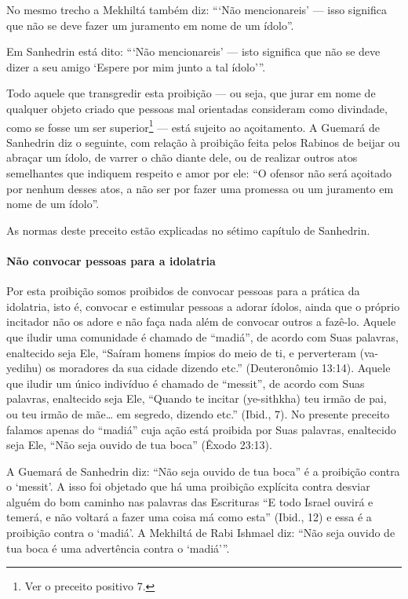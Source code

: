 No mesmo trecho a Mekhiltá também diz: ```Não mencionareis' --- isso
significa que não se deve fazer um juramento em nome de um ídolo''.

Em Sanhedrin está dito: ```Não mencionareis' --- isto significa que não
se deve dizer a seu amigo `Espere por mim junto a tal ídolo'''.

Todo aquele que transgredir esta proibição --- ou seja, que jurar em
nome de qualquer objeto criado que pessoas mal orientadas consideram
como divindade, como se fosse um ser superior\footnote{Ver o preceito positivo 7.} ---
está sujeito ao açoitamento. A Guemará de Sanhedrin diz o seguinte, com
relação à proibição feita pelos Rabinos de beijar ou abraçar um ídolo,
de varrer o chão diante dele, ou de realizar outros atos semelhantes que
indiquem respeito e amor por ele: ``O ofensor não será açoitado por
nenhum desses atos, a não ser por fazer uma promessa ou um juramento em
nome de um ídolo''.

As normas deste preceito estão explicadas no sétimo capítulo de Sanhedrin.

\paragraph{Não convocar pessoas para a idolatria}

Por esta proibição somos proibidos de convocar pessoas para a prática
da idolatria, isto é, convocar e estimular pessoas a adorar ídolos,
ainda que o próprio incitador não os adore e não faça nada além de
convocar outros a fazê-lo. Aquele que iludir uma comunidade é chamado de
``madiá'', de acordo com Suas palavras, enaltecido seja Ele, ``Saíram
homens ímpios do meio de ti, e perverteram (va-yedihu) os moradores da
sua cidade dizendo etc.'' (Deuteronômio 13:14). Aquele que iludir um
único indivíduo é chamado de ``messit'', de acordo com Suas palavras,
enaltecido seja Ele, ``Quando te incitar (ye-sithkha) teu irmão de pai,
ou teu irmão de mãe\ldots{} em segredo, dizendo etc.'' (Ibid., 7). No
presente preceito falamos apenas do ``madiá'' cuja ação está proibida
por Suas palavras, enaltecido seja Ele, ``Não seja ouvido de tua boca''
(Êxodo 23:13).

A Guemará de Sanhedrin diz: ``Não seja ouvido de tua boca'' é a
proibição contra o `messit'. A isso foi objetado que há uma proibição
explícita contra desviar alguém do bom caminho nas palavras das
Escrituras ``E todo Israel ouvirá e temerá, e não voltará a fazer uma
coisa má como esta'' (Ibid., 12) e essa é a proibição contra o `madiá'.
A Mekhiltá de Rabi Ishmael diz: ``Não seja ouvido de tua boca é uma
advertência contra o `madiá'''.

